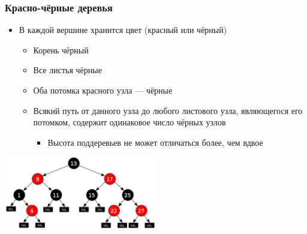 \documentclass[xetex,mathserif,serif]{beamer}
\begin{document}
	\begin{frame}
		\frametitle{Красно-чёрные деревья}
		\begin{itemize}
			\item В каждой вершине хранится цвет (красный или чёрный)
			\begin{itemize}
				\item Корень чёрный
				\item Все листья чёрные
				\item Оба потомка красного узла --- чёрные
				\item Всякий путь от данного узла до любого листового узла, являющегося его потомком, содержит одинаковое число чёрных узлов
				\begin{itemize}
					\item Высота поддеревьев не может отличаться более, чем вдвое
				\end{itemize}
			\end{itemize}
		\end{itemize}
		\begin{center}
			\includegraphics[width=0.5\textwidth]{redBlackTree.png}
		\end{center}
	\end{frame}
\end{document}
